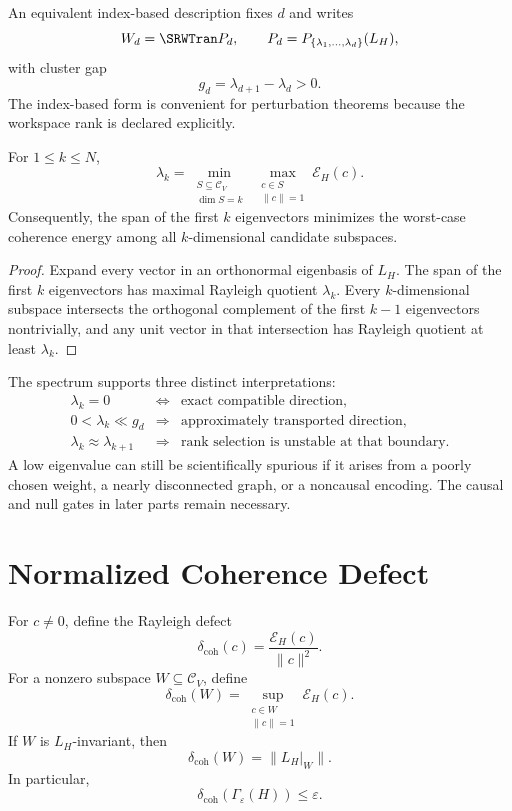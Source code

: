 An equivalent index-based description fixes \(d\) and writes
\[
W_d=\SRWTran P_d,
\qquad
P_d=P_{\{\lambda_1,\ldots,\lambda_d\}}(L_H),
\]
with cluster gap
\[
g_d=\lambda_{d+1}-\lambda_d>0.
\]
The index-based form is convenient for perturbation theorems because the
workspace rank is declared explicitly.

\begin{SRWTproposition}\label{SRWT:prop:minmax}
For \(1\leq k\leq N\),
\[
\lambda_k
=
\min_{\substack{S\subseteq\mathcal C_V\\\dim S=k}}
\ \max_{\substack{c\in S\\\|c\|=1}}
\mathcal E_H(c).
\]
Consequently, the span of the first \(k\) eigenvectors minimizes the worst-case
coherence energy among all \(k\)-dimensional candidate subspaces.
\end{SRWTproposition}

\begin{proof}
Expand every vector in an orthonormal eigenbasis of \(L_H\). The span of the
first \(k\) eigenvectors has maximal Rayleigh quotient \(\lambda_k\). Every
\(k\)-dimensional subspace intersects the orthogonal complement of the first
\(k-1\) eigenvectors nontrivially, and any unit vector in that intersection has
Rayleigh quotient at least \(\lambda_k\).
\end{proof}


The spectrum supports three distinct interpretations:
\[
\begin{array}{rcl}
\lambda_k=0
&\Longleftrightarrow&
\text{exact compatible direction},\\
0<\lambda_k\ll g_d
&\Longrightarrow&
\text{approximately transported direction},\\
\lambda_k\approx\lambda_{k+1}
&\Longrightarrow&
\text{rank selection is unstable at that boundary}.
\end{array}
\]
A low eigenvalue can still be scientifically spurious if it arises from a
poorly chosen weight, a nearly disconnected graph, or a noncausal encoding.
The causal and null gates in later parts remain necessary.

\section{Normalized Coherence Defect}

For \(c\neq0\), define the Rayleigh defect
\[
\delta_{\mathrm{coh}}(c)
=
\frac{\mathcal E_H(c)}{\|c\|^2}.
\]
For a nonzero subspace \(W\subseteq\mathcal C_V\), define
\[
\delta_{\mathrm{coh}}(W)
=
\sup_{\substack{c\in W\\\|c\|=1}}
\mathcal E_H(c).
\]
If \(W\) is \(L_H\)-invariant, then
\[
\delta_{\mathrm{coh}}(W)
=
\|L_H|_W\|.
\]
In particular,
\[
\delta_{\mathrm{coh}}(\Gamma_\varepsilon(H))
\leq\varepsilon.
\]

